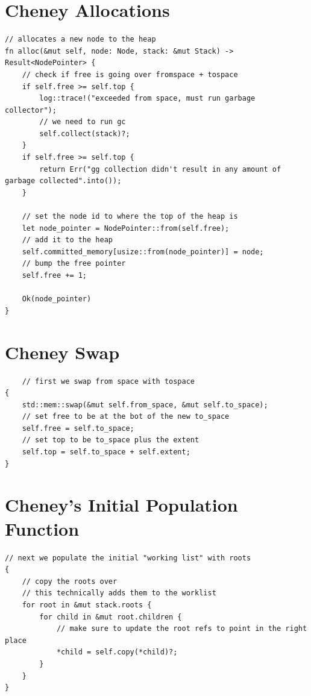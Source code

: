\documentclass[index]{subfiles}
\begin{document}
\section{Cheney Allocations}
\begin{verbatim}
// allocates a new node to the heap
fn alloc(&mut self, node: Node, stack: &mut Stack) -> Result<NodePointer> {
    // check if free is going over fromspace + tospace
    if self.free >= self.top {
        log::trace!("exceeded from space, must run garbage collector");
        // we need to run gc
        self.collect(stack)?;
    }
    if self.free >= self.top {
        return Err("gg collection didn't result in any amount of garbage collected".into());
    }

    // set the node id to where the top of the heap is
    let node_pointer = NodePointer::from(self.free);
    // add it to the heap
    self.committed_memory[usize::from(node_pointer)] = node;
    // bump the free pointer
    self.free += 1;

    Ok(node_pointer)
}
\end{verbatim}
\section{Cheney Swap}
\begin{verbatim}
    // first we swap from space with tospace
{
    std::mem::swap(&mut self.from_space, &mut self.to_space);
    // set free to be at the bot of the new to_space
    self.free = self.to_space;
    // set top to be to_space plus the extent
    self.top = self.to_space + self.extent;
}
\end{verbatim}
\section{Cheney's Initial Population Function}
\begin{verbatim}
// next we populate the initial "working list" with roots
{
    // copy the roots over
    // this technically adds them to the worklist
    for root in &mut stack.roots {
        for child in &mut root.children {
            // make sure to update the root refs to point in the right place
            *child = self.copy(*child)?;
        }
    }
}
\end{verbatim}
\end{document}
